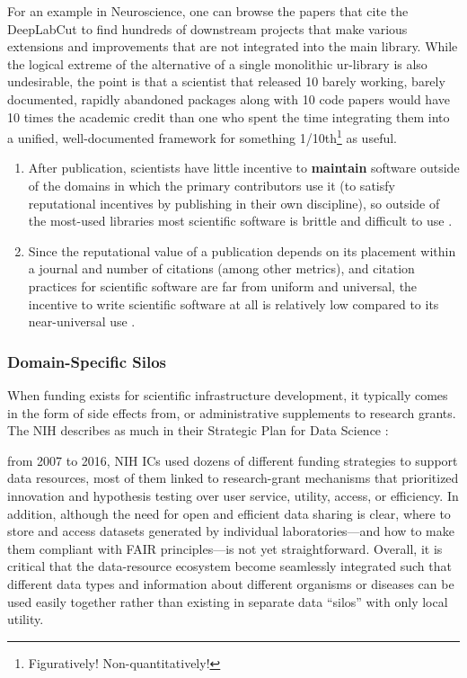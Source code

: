 \documentclass[10pt]{article}
\begin{document}
\begin{multicols}{2}
For an example in Neuroscience, one can browse the papers that cite the
DeepLabCut \cite{mathisDeepLabCutMarkerlessPose2018a}  to find
hundreds of downstream projects that make various extensions and
improvements that are not integrated into the main library. While the
logical extreme of the alternative of a single monolithic ur-library is
also undesirable, the point is that a scientist that released 10 barely
working, barely documented, rapidly abandoned packages along with 10
code papers would have 10 times the academic credit than one who spent
the time integrating them into a unified, well-documented framework for
something 1/10th\footnote{Figuratively! Non-quantitatively!} as useful.

\begin{enumerate}
\def\labelenumi{\arabic{enumi})}
\setcounter{enumi}{1}
\item
  After publication, scientists have little incentive to
  \textbf{maintain} software outside of the domains in which the primary
  contributors use it (to satisfy reputational incentives by publishing
  in their own discipline), so outside of the most-used libraries most
  scientific software is brittle and difficult to use \cite{mangulImprovingUsabilityArchival2019, kumarBioinformaticsSoftwareBiologists2007} .
\item
  Since the reputational value of a publication depends on its placement
  within a journal and number of citations (among other metrics), and
  citation practices for scientific software are far from uniform and
  universal, the incentive to write scientific software at all is
  relatively low compared to its near-universal use \cite{howisonSoftwareScientificLiterature2016} .
\end{enumerate}

\hypertarget{domain-specific-silos}{%
\subsubsection{Domain-Specific Silos}\label{domain-specific-silos}}

When funding exists for scientific infrastructure development, it
typically comes in the form of side effects from, or administrative
supplements to research grants. The NIH describes as much in their
Strategic Plan for Data Science \cite{NIH, StrategicPlan2018} :

\begin{leftbar}
from 2007 to 2016, NIH ICs used dozens of different funding strategies
to support data resources, most of them linked to research-grant
mechanisms that prioritized innovation and hypothesis testing over user
service, utility, access, or efficiency. In addition, although the need
for open and efficient data sharing is clear, where to store and access
datasets generated by individual laboratories---and how to make them
compliant with FAIR principles---is not yet straightforward. Overall, it
is critical that the data-resource ecosystem become seamlessly
integrated such that different data types and information about
different organisms or diseases can be used easily together rather than
existing in separate data ``silos'' with only local utility.
\end{leftbar}


\end{multicols}
\end{document}
